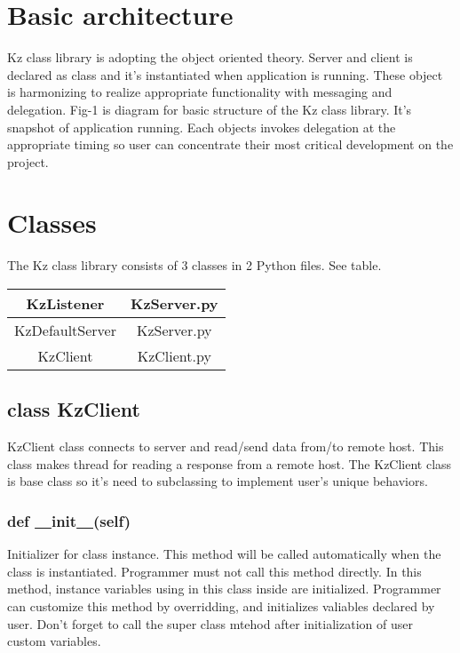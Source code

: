 \documentclass[a4paper,10pt]{jsarticle}
\begin{document}
\section{Basic architecture}
Kz class library is adopting the object oriented theory. Server and client is declared as class and it's instantiated when application is running. These object is harmonizing to realize appropriate functionality with messaging and delegation.
Fig-1 is diagram for basic structure of the Kz class library. It's snapshot of application running.
 Each objects invokes delegation at the appropriate timing so user can concentrate their most critical development on the project.

\section{Classes}
The Kz class library consists of 3 classes in 2 Python files.  See table.

\begin{table}[htbp]
\begin{center}
\begin{tabular}{|c|c|}
	\hline
	KzListener	&KzServer.py	\\
	\hline
	KzDefaultServer	&KzServer.py	\\
	\hline
	KzClient	&KzClient.py	\\
	\hline
\end{tabular}
\end{center}
\end{table}

\subsection{class KzClient}
KzClient class connects to server and read/send data from/to remote host.
This class makes thread for reading a response from a remote host.
The KzClient class is base class so it's need to subclassing to implement user's unique behaviors.

\subsubsection{def \underline{\ \ }init\underline{\ \ }(self)}
Initializer for class instance. This method will be called automatically when the class is instantiated.
Programmer must not call this method directly.
In this method, instance variables using in this class inside are initialized.
Programmer can customize this method by overridding, and initializes valiables declared by user.
Don't forget to call the super class mtehod after initialization of user custom variables.
\end{document}
